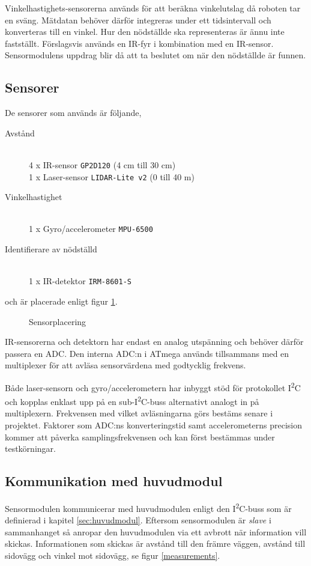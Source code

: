 \documentclass[11pt]{article}
\begin{document}
\begin{flushleft}
Vinkelhastighets-sensorerna används för att beräkna vinkelutslag då roboten tar en sväng. Mätdatan behöver därför integreras under ett tidsintervall och konverteras till en vinkel. Hur den nödställde ska representeras är ännu inte fastställt. Förslagsvis används en IR-fyr i kombination med en IR-sensor. Sensormodulens uppdrag blir då att ta beslutet om när den nödställde är funnen.


\subsection{Sensorer}
De sensorer som används är följande,
\begin{description}
	\item[Avstånd] \hfill \\
	4 x IR-sensor \verb+GP2D120+ (4 cm till 30 cm) \\
	1 x Laser-sensor \verb+LIDAR-Lite v2+ (0 till 40 m) \\
	\item[Vinkelhastighet] \hfill \\
	1 x Gyro/accelerometer \verb+MPU-6500+ 
	\item[Identifierare av nödställd] \hfill \\
	1 x IR-detektor \verb+IRM-8601-S+
\end{description}
och är placerade enligt figur \ref{sensors}. 

\begin{figure}[htbp]
\centering
\noindent\resizebox{.8\textwidth}{!}{
		}
	\caption{Sensorplacering \label{sensors}}
\end{figure}

IR-sensorerna och detektorn har endast en analog utspänning och behöver därför passera en ADC. Den interna ADC:n i ATmega används tillsammans med en multiplexer för att avläsa sensorvärdena med godtycklig frekvens. 

Både laser-sensorn och gyro/accelerometern har inbyggt stöd för protokollet I\textsuperscript{2}C och kopplas enklast upp på en sub-I\textsuperscript{2}C-buss alternativt analogt in på multiplexern. Frekvensen med vilket avläsningarna görs bestäms senare i projektet. Faktorer som ADC:ns konverteringstid samt accelerometerns precision kommer att påverka samplingsfrekvensen och kan först bestämmas under testkörningar. 

\subsection{Kommunikation med huvudmodul}
Sensormodulen kommunicerar med huvudmodulen enligt den I\textsuperscript{2}C-buss som är definierad i kapitel \ref{sec:huvudmodul}. Eftersom sensormodulen är \emph{slave} i sammanhanget så anropar den huvudmodulen via ett avbrott när information vill skickas. Informationen som skickas är avstånd till den främre väggen, avstånd till sidovägg och vinkel mot sidovägg, se figur \ref{measurements}. 


\end{flushleft}
\end{document}
